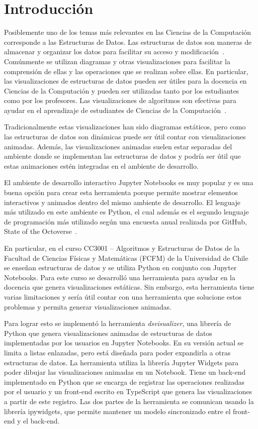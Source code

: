 \chapter{Introducción}

Posiblemente uno de los temas más relevantes en las Ciencias de la Computación corresponde a las Estructuras de Datos. Las estructuras de datos son maneras de almacenar y organizar los datos para facilitar su acceso y modificación~\cite{Algorithms}. Comúnmente se utilizan diagramas y otras visualizaciones para facilitar la comprensión de ellas y las operaciones que se realizan sobre ellas. En particular, las visualizaciones de estructuras de datos pueden ser útiles para la docencia en Ciencias de la Computación y pueden ser utilizadas tanto por los estudiantes como por los profesores. Las visualizaciones de algoritmos son efectivas para ayudar en el aprendizaje de estudiantes de Ciencias de la Computación~\cite{Hundhausen2002}.

Tradicionalmente estas visualizaciones han sido diagramas estáticos, pero como las estructuras de datos son dinámicas puede ser útil contar con visualizaciones animadas. Además, las visualizaciones animadas suelen estar separadas del ambiente donde se implementan las estructuras de datos y podría ser útil que estas animaciones estén integradas en el ambiente de desarrollo.

El ambiente de desarrollo interactivo Jupyter Notebooks es muy popular y es una buena opción para crear esta herramienta porque permite mostrar elementos interactivos y animados dentro del mismo ambiente de desarrollo. El lenguaje más utilizado en este ambiente es Python, el cual además es el segundo lenguaje de programación más utilizado según una encuesta anual realizada por GitHub, State of the Octoverse~\cite{encuesta-github}.

En particular, en el curso CC3001 -- Algoritmos y Estructuras de Datos de la Facultad de Ciencias Físicas y Matemáticas (FCFM) de la Universidad de Chile se enseñan estructuras de datos y se utiliza Python en conjunto con Jupyter Notebooks. Para este curso se desarrolló una herramienta para ayudar en la docencia que genera visualizaciones estáticas. Sin embargo, esta herramienta tiene varias limitaciones y sería útil contar con una herramienta que solucione estos problemas y permita generar visualizaciones animadas. 

Para lograr esto se implementó la herramienta \textit{dsvisualizer}, una librería de Python que genera visualizaciones animadas de estructuras de datos implementadas por los usuarios en Jupyter Notebooks. En su versión actual se limita a listas enlazadas, pero está diseñada para poder expandirla a otras estructuras de datos. La herramienta utiliza la librería Jupyter Widgets para poder dibujar las visualizaciones animadas en un Notebook. Tiene un back-end implementado en Python que se encarga de registrar las operaciones realizadas por el usuario y un front-end escrito en TypeScript que genera las visualizaciones a partir de este registro. Las dos partes de la herramienta se comunican usando la librería ipywidgets, que permite mantener un modelo sincronizado entre el front-end y el back-end.


